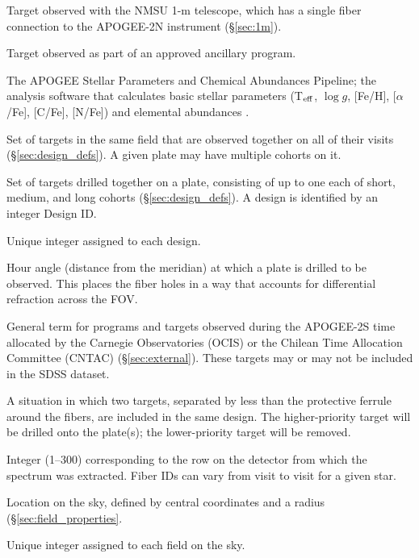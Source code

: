\documentclass[12pt,twocolumn]{emulateapj}
\begin{document}
\begin{appendix}
\begin{description} \itemsep -2pt
\item[1-Meter Target] Target observed with the NMSU 1-m telescope, which has a single fiber connection to the APOGEE-2N instrument (\S\ref{sec:1m}).
\item[Ancillary Target] Target observed as part of an approved ancillary program.
\item[ASPCAP] The APOGEE Stellar Parameters and Chemical Abundances Pipeline; the analysis software that calculates basic stellar parameters (T$_{\rm eff}$, $\log{g}$, [Fe/H], [$\alpha$/Fe], [C/Fe], [N/Fe]) and elemental abundances \citep{Holtzman_2015_apogeedata,GarciaPerez_2016_aspcap}.
\item[Cohort] Set of targets in the same field that are observed together on all of their visits (\S\ref{sec:design_defs}).  A given plate may have multiple cohorts on it.
\item[Design] Set of targets drilled together on a plate, consisting of up to one each of short, medium, and long cohorts (\S\ref{sec:design_defs}).  A design is identified by an integer Design ID.  %
\item[Design ID] Unique integer assigned to each design.
\item[Drill Angle] Hour angle (distance from the meridian) at which a plate is drilled to be observed.  This places the fiber holes in a way that accounts for differential refraction across the FOV.
\item[External Program] General term for programs and targets observed during the APOGEE-2S time allocated by the Carnegie Observatories (OCIS) or the Chilean Time Allocation Committee (CNTAC) (\S\ref{sec:external}).  These targets may or may not be included in the SDSS dataset.
\item[Fiber Collision] A situation in which two targets, separated by less than the protective ferrule around the fibers, are included in the same design.  The higher-priority target will be drilled onto the plate(s); the lower-priority target will be removed.
\item[Fiber ID] Integer (1--300) corresponding to the row on the detector from which the spectrum was extracted.  Fiber IDs can vary from visit to visit for a given star.
\item[Field] Location on the sky, defined by central coordinates and a radius (\S\ref{sec:field_properties}.  %
\item[Location ID] Unique integer assigned to each field on the sky.

\end{description}
\end{appendix}
\end{document}
